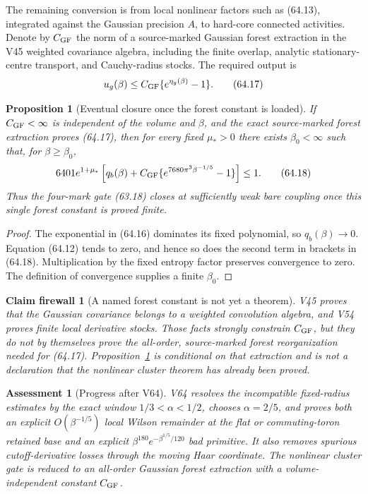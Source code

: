 \documentclass[11pt,oneside]{book}
\newtheorem{proposition}[theorem]{Proposition}
\newtheorem{assessment}[theorem]{Assessment}
\newtheorem{firewall}[theorem]{Claim firewall}
\theoremstyle{definition}
\theoremstyle{remark}
\begin{document}
The remaining conversion is from local nonlinear factors such as
(64.13), integrated against the Gaussian precision \(A\), to
hard-core connected activities.  Denote by \(C_{\rm GF}\) the norm
of a source-marked Gaussian forest extraction in the V45 weighted
covariance algebra, including the finite overlap, analytic stationary-
centre transport, and Cauchy-radius stocks.  The required output is
\[
 u_g(\beta)
 \le C_{\rm GF}\{e^{\eta_g(\beta)}-1\}.                     \tag{64.17}
\]

\begin{proposition}[Eventual closure once the forest constant is loaded]
\label{prop:e8v64-eventual-gate}
If \(C_{\rm GF}<\infty\) is independent of the volume and \(\beta\),
and the exact source-marked forest extraction proves (64.17), then
for every fixed \(\mu_*>0\) there exists \(\beta_0<\infty\) such
that, for \(\beta\ge\beta_0\),
\[
 6401e^{1+\mu_*}
 \left[q_b(\beta)+
 C_{\rm GF}\{e^{7680\pi^3\beta^{-1/5}}-1\}\right]\le1.     \tag{64.18}
\]
Thus the four-mark gate (63.18) closes at sufficiently weak bare
coupling once this single forest constant is proved finite.
\end{proposition}

\begin{proof}
The exponential in (64.16) dominates its fixed polynomial, so
\(q_b(\beta)\to0\).  Equation (64.12) tends to zero, and hence so
does the second term in brackets in (64.18).  Multiplication by the
fixed entropy factor preserves convergence to zero.  The definition
of convergence supplies a finite \(\beta_0\).
\end{proof}

\begin{firewall}[A named forest constant is not yet a theorem]
\label{fire:e8v64-forest-debit}
V45 proves that the Gaussian covariance belongs to a weighted
convolution algebra, and V54 proves finite local derivative stocks.
Those facts strongly constrain \(C_{\rm GF}\), but they do not by
themselves prove the all-order, source-marked forest reorganization
needed for (64.17).  Proposition~\ref{prop:e8v64-eventual-gate} is
conditional on that extraction and is not a declaration that the
nonlinear cluster theorem has already been proved.
\end{firewall}

\begin{assessment}[Progress after V64]
\label{ass:e8v64-status}
V64 resolves the incompatible fixed-radius estimates by the exact
window \(1/3<\alpha<1/2\), chooses \(\alpha=2/5\), and proves both
an explicit \(O(\beta^{-1/5})\) local Wilson remainder at the flat
or commuting-toron retained base and an
explicit \(\beta^{180}e^{-\beta^{1/5}/120}\) bad primitive.  It
also removes spurious cutoff-derivative losses through the moving
Haar coordinate.  The nonlinear cluster gate is reduced to an
all-order Gaussian forest extraction with a volume-independent
constant \(C_{\rm GF}\).
\end{assessment}
\end{document}
